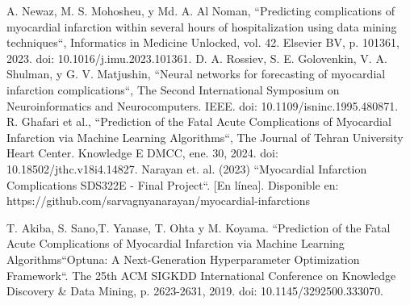 \documentclass[conference]{IEEEtran}
\begin{document}
\begin{thebibliography}{00}
 A. Newaz, M. S. Mohosheu, y Md. A. Al Noman, ``Predicting complications of myocardial infarction within several hours of hospitalization using data mining techniques``, Informatics in Medicine Unlocked, vol. 42. Elsevier BV, p. 101361, 2023. doi: 10.1016/j.imu.2023.101361.
 D. A. Rossiev, S. E. Golovenkin, V. A. Shulman, y G. V. Matjushin, ``Neural networks for forecasting of myocardial infarction complications``, The Second International Symposium on Neuroinformatics and Neurocomputers. IEEE. doi: 10.1109/isninc.1995.480871.
 R. Ghafari et al., ``Prediction of the Fatal Acute Complications of Myocardial Infarction via Machine Learning Algorithms``, The Journal of Tehran University Heart Center. Knowledge E DMCC, ene. 30, 2024. doi: 10.18502/jthc.v18i4.14827.
 Narayan et. al. (2023) ``Myocardial Infarction Complications SDS322E - Final Project``. [En línea]. Disponible en: https://github.com/sarvagnyanarayan/myocardial-infarctions

 T. Akiba, S. Sano,T. Yanase, T. Ohta y M. Koyama. ``Prediction of the Fatal Acute Complications of Myocardial Infarction via Machine Learning Algorithms``Optuna: A Next-Generation Hyperparameter Optimization Framework``. The 25th ACM SIGKDD International Conference on Knowledge Discovery \& Data Mining, p. 2623-2631, 2019. doi: 10.1145/3292500.333070.
\end{thebibliography} 
\end{document}

